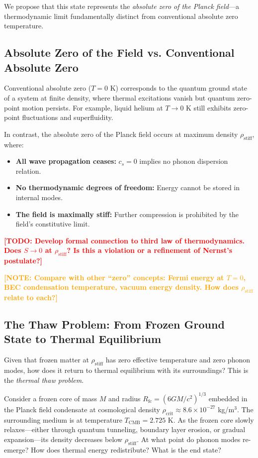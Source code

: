 \documentclass[11pt,a4paper]{article}
\newcommand{\rhocrit}{\ensuremath{\rho_{\mathrm{crit}}}}
\newcommand{\rhostiff}{\ensuremath{\rho_{\mathrm{stiff}}}}
\newcommand{\cs}{\ensuremath{c_s}}
\newcommand{\TCMB}{\ensuremath{T_{\mathrm{CMB}}}}
\newcommand{\Rfc}{\ensuremath{R_{\mathrm{fc}}}}
\newcommand{\TODO}[1]{\textcolor{red}{\textbf{[TODO: #1]}}}
\newcommand{\NOTE}[1]{\textcolor{orange}{\textbf{[NOTE: #1]}}}
\theoremstyle{definition}
\theoremstyle{remark}
\begin{document}
We propose that this state represents the \emph{absolute zero of the Planck field}---a thermodynamic limit fundamentally distinct from conventional absolute zero temperature.

\subsection{Absolute Zero of the Field vs. Conventional Absolute Zero}
\label{sec:two_zeros}

Conventional absolute zero ($T = 0$ K) corresponds to the quantum ground state of a system at finite density, where thermal excitations vanish but quantum zero-point motion persists. For example, liquid helium at $T \to 0$ K still exhibits zero-point fluctuations and superfluidity.

\vspace{0.5em}
\noindent
In contrast, the absolute zero of the Planck field occurs at maximum density $\rhostiff$, where:
\begin{itemize}[leftmargin=*, itemsep=0.3em]
\item \textbf{All wave propagation ceases:} $\cs = 0$ implies no phonon dispersion relation.
\item \textbf{No thermodynamic degrees of freedom:} Energy cannot be stored in internal modes.
\item \textbf{The field is maximally stiff:} Further compression is prohibited by the field's constitutive limit.
\end{itemize}

\TODO{Develop formal connection to third law of thermodynamics. Does $S \to 0$ at $\rhostiff$? Is this a violation or a refinement of Nernst's postulate?}

\NOTE{Compare with other ``zero'' concepts: Fermi energy at $T=0$, BEC condensation temperature, vacuum energy density. How does $\rhostiff$ relate to each?}

\subsection{The Thaw Problem: From Frozen Ground State to Thermal Equilibrium}
\label{sec:thaw_problem}

Given that frozen matter at $\rhostiff$ has zero effective temperature and zero phonon modes, how does it return to thermal equilibrium with its surroundings? This is the \emph{thermal thaw problem}.

\vspace{0.5em}
\noindent
Consider a frozen core of mass $M$ and radius $\Rfc = (6GM/c^2)^{1/3}$ embedded in the Planck field condensate at cosmological density $\rhocrit \approx 8.6 \times 10^{-27}$ kg/m$^3$. The surrounding medium is at temperature $\TCMB = 2.725$ K. As the frozen core slowly relaxes---either through quantum tunneling, boundary layer erosion, or gradual expansion---its density decreases below $\rhostiff$. At what point do phonon modes re-emerge? How does thermal energy redistribute? What is the end state?
\end{document}
